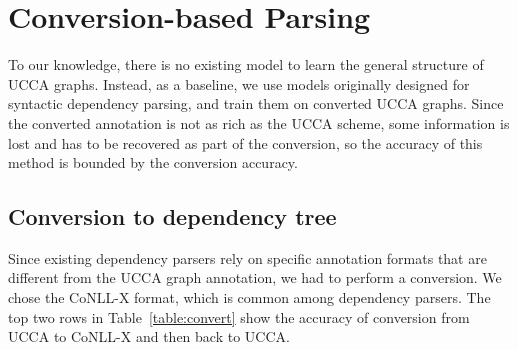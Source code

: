 \documentclass[11pt]{article}
\begin{document}





\section{Conversion-based Parsing}\label{sec:conversion_approach}

To our knowledge, there is no existing model to learn the general structure of UCCA graphs. Instead, as a baseline, we use models originally designed for syntactic dependency parsing, and train them on converted UCCA graphs. Since the converted annotation is not as rich as the UCCA scheme, some information is lost and has to be recovered as part of the conversion, so the accuracy of this method is bounded by the conversion accuracy.

\subsection{Conversion to dependency tree}

Since existing dependency parsers rely on specific annotation formats that are different from the UCCA graph annotation, we had to perform a conversion. We chose the CoNLL-X format, which is common among dependency parsers.
The top two rows in Table~\ref{table:convert} show the accuracy of conversion from UCCA to CoNLL-X and then back to UCCA.
\end{document}
